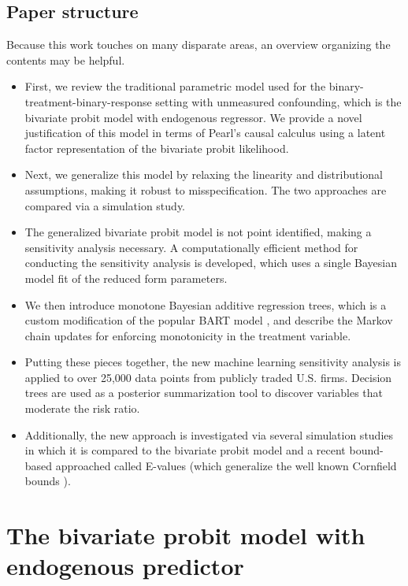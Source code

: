 \documentclass[aoas,preprint, 11pt, dvipsnames, table, x11name]{imsart}
\theoremstyle{remark}
\begin{document}
\subsection{Paper structure}
Because this work touches on many disparate areas, an overview organizing the contents may be helpful.
\begin{itemize}
\item First, we review the traditional parametric model used for the binary-treatment-binary-response setting with unmeasured confounding, which is the bivariate probit model with endogenous regressor. We provide a novel justification of this model in terms of Pearl's causal calculus using a latent factor representation of the bivariate probit likelihood. 
\item Next, we generalize this model by relaxing the linearity and distributional assumptions, making it robust to misspecification. The two approaches are compared via a simulation study.
\item The generalized bivariate probit model is not point identified, making a sensitivity analysis necessary. A computationally efficient method for conducting the sensitivity analysis is developed, which uses a single Bayesian model fit of the reduced form parameters.
\item We then introduce monotone Bayesian additive regression trees, which is a custom modification of the popular BART model \citep{bart}, and describe the Markov chain updates for enforcing monotonicity in the treatment variable.
\item Putting these pieces together, the new machine learning sensitivity analysis is applied to over 25,000 data points from publicly traded U.S. firms. Decision trees are used as a posterior summarization tool to discover variables that moderate the risk ratio.  
\item Additionally, the new approach is investigated via several simulation studies in which it is compared to the bivariate probit model and a recent bound-based approached called E-values \citep{Peng-2016} (which generalize the well known Cornfield bounds \citep{Cornfield}).
\end{itemize}

\section{The bivariate probit model with endogenous predictor}
\end{document}
